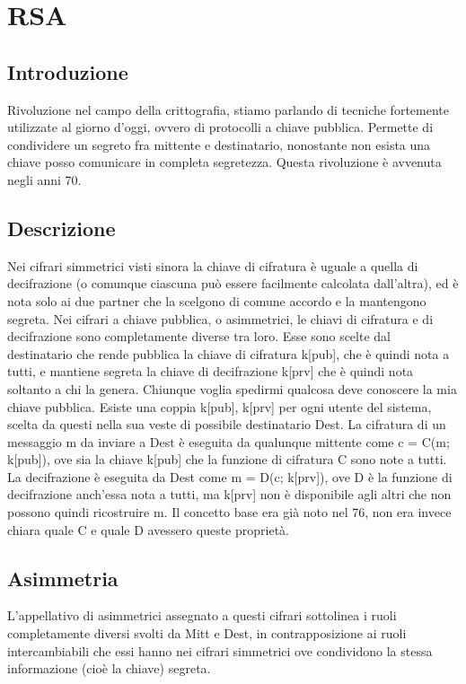 \chapter{RSA}

\section{Introduzione}

Rivoluzione nel campo della crittografia, stiamo parlando di tecniche fortemente utilizzate al giorno d'oggi, ovvero di protocolli a chiave pubblica. Permette di condividere un segreto fra mittente e destinatario, nonostante non esista una chiave posso comunicare in completa segretezza. Questa rivoluzione è avvenuta negli anni 70.

\section{Descrizione}

Nei cifrari simmetrici visti sinora la chiave di cifratura è
uguale a quella di decifrazione (o comunque ciascuna può
essere facilmente calcolata dall’altra), ed è nota solo ai
due partner che la scelgono di comune accordo e la
mantengono segreta. Nei cifrari a chiave pubblica, o asimmetrici, le chiavi di cifratura e di decifrazione sono completamente diverse tra
loro. Esse sono scelte dal destinatario che rende pubblica
la chiave di cifratura k[pub], che è quindi nota a tutti, e
mantiene segreta la chiave di decifrazione k[prv] che è
quindi nota soltanto a chi la genera. Chiunque voglia spedirmi qualcosa deve conoscere la mia chiave pubblica. Esiste una coppia k[pub], k[prv] per ogni utente del
sistema, scelta da questi nella sua veste di possibile
destinatario Dest. La cifratura di un messaggio m da
inviare a Dest è eseguita da qualunque mittente come
c = C(m; k[pub]), ove sia la chiave k[pub] che la funzione
di cifratura C sono note a tutti. La decifrazione è eseguita
da Dest come m = D(c; k[prv]), ove D è la funzione di
decifrazione anch’essa nota a tutti, ma k[prv] non è
disponibile agli altri che non possono quindi ricostruire m. Il concetto base era già noto nel 76, non era invece chiara quale C e quale D avessero queste proprietà.

\section{Asimmetria}

L’appellativo di asimmetrici assegnato a questi cifrari
sottolinea i ruoli completamente diversi svolti da Mitt e
Dest, in contrapposizione ai ruoli intercambiabili che essi
hanno nei cifrari simmetrici ove condividono la stessa
informazione (cioè la chiave) segreta. 


